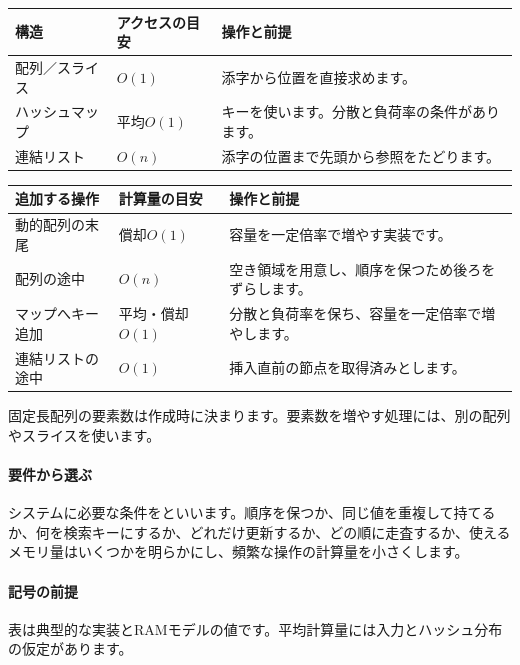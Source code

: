 \begingroup
  \noindent
  \begin{tabularx}{\textwidth}{@{}p{38mm}p{34mm}Y@{}}
    \toprule
    構造 & アクセスの目安 & 操作と前提\\
    \midrule
    配列／スライス & $O(1)$ & 添字から位置を直接求めます。\\
    ハッシュマップ & 平均$O(1)$ & キーを使います。分散と負荷率の条件があります。\\
    連結リスト & $O(n)$ & 添字の位置まで先頭から参照をたどります。\\
    \bottomrule
  \end{tabularx}
  \par\medskip
  \begin{tabularx}{\textwidth}{@{}p{38mm}p{34mm}Y@{}}
    \toprule
    追加する操作 & 計算量の目安 & 操作と前提\\
    \midrule
    動的配列の末尾 & 償却$O(1)$ & 容量を一定倍率で増やす実装です。\\
    配列の途中 & $O(n)$ & 空き領域を用意し、順序を保つため後ろをずらします。\\
    マップへキー追加 & 平均・償却$O(1)$ & 分散と負荷率を保ち、容量を一定倍率で増やします。\\
    連結リストの途中 & $O(1)$ & 挿入直前の節点を取得済みとします。\\
    \bottomrule
  \end{tabularx}
  \par\smallskip
  固定長配列の要素数は作成時に決まります。要素数を増やす処理には、別の配列やスライスを使います。
  \vspace{2mm}
\begingroup
\paragraph{要件から選ぶ}
        システムに必要な条件をといいます。順序を保つか、同じ値を重複して持てるか、何を検索キーにするか、どれだけ更新するか、どの順に走査するか、使えるメモリ量はいくつかを明らかにし、頻繁な操作の計算量を小さくします。

\par
\endgroup
\medskip
\begingroup
\paragraph{記号の前提}
        表は典型的な実装とRAMモデルの値です。平均計算量には入力とハッシュ分布の仮定があります。

\par
\endgroup
\par
\endgroup


